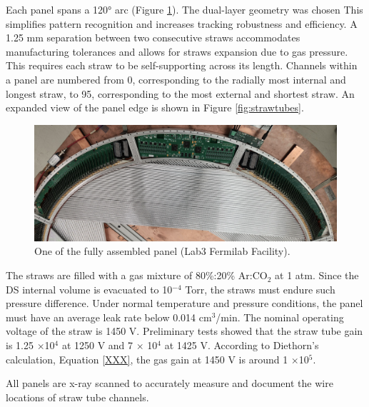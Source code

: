 Each panel spans a 120° arc (Figure \ref{fig:gonzalo}).
The dual-layer geometry was chosen 
%
This simplifies pattern recognition and increases tracking robustness and efficiency. 
A 1.25 mm separation between two consecutive straws accommodates 
manufacturing tolerances and allows for straws expansion due to gas 
pressure. This requires each straw to be self-supporting across its 
length. Channels within a panel are numbered from 0, 
corresponding to the radially most internal and longest straw, 
to 95, corresponding to the most external and shortest straw. 
An expanded view 
of the panel edge is shown in Figure \ref{fig:strawtubes}.
            \begin{figure}[!h]
                \centering
                \includegraphics[width =\textwidth]{figures/png/image.png}
                \caption[One of the fully assembled panel.]{One of the fully assembled panel (Lab3 Fermilab Facility).}
                \label{fig:gonzalo}
                \end{figure}

            The straws are filled with a gas mixture of 80\%:20\% Ar:CO$_2$ at 1 atm.
            Since the DS internal volume is evacuated to 10$^{-4}$ Torr, 
            the straws must endure such pressure difference. Under normal temperature and 
            pressure conditions, the panel must have an average leak rate below 0.014 cm$^3$/min.  
            The nominal operating voltage of the straw is 1450 V. 
            Preliminary tests showed that the straw 
            tube gain is 1.25 $\times$10$^4$ at 1250 V and 7 $\times$ 10$^4$ at 
            1425 V. According to Diethorn's calculation, Equation \ref{XXX}, 
            the gas gain at 1450 V is around 1 $\times$10$^5$.
 

All panels are x-ray scanned 
to accurately measure and document the wire 
locations of straw tube channels. 

